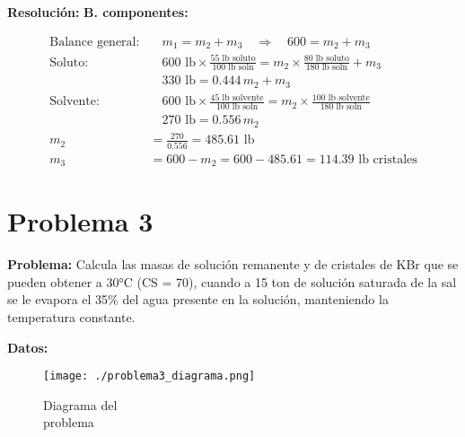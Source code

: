 \documentclass{article} %
\begin{document}

\noindent\textbf{} %

\textbf{Resolución:} %
\textbf{B. componentes:}

\begin{align*}
    \text{Balance general:} & \quad m_1 = m_2 + m_3 \quad \Rightarrow \quad 600 = m_2 + m_3 \\[10pt]
    \text{Soluto:} & \quad 600 \text{ lb} \times \frac{55 \text{ lb soluto}}{100 \text{ lb soln}} = m_2 \times \frac{80 \text{ lb soluto}}{180 \text{ lb soln}} + m_3 \\[10pt]
    & \quad 330 \text{ lb} = 0.444 \, m_2 + m_3 \\[10pt]
    \text{Solvente:} & \quad 600 \text{ lb} \times \frac{45 \text{ lb solvente}}{100 \text{ lb soln}} = m_2 \times \frac{100 \text{ lb solvente}}{180 \text{ lb soln}} \\[10pt]
    & \quad 270 \text{ lb} = 0.556 \, m_2 \\[10pt]
    m_2 &= \frac{270}{0.556} = 485.61 \text{ lb} \\[10pt]
    m_3 &= 600 - m_2 = 600 - 485.61 = 114.39 \text{ lb cristales}
\end{align*}


\newpage %
\section*{Problema 3} %
\textbf{Problema:} Calcula las masas de solución remanente y de cristales de KBr que se pueden obtener a 30°C (CS = 70), cuando a 15 ton de solución saturada de la sal se le evapora el 35\% del agua presente en la solución, manteniendo la temperatura constante.


\noindent\textbf{Datos:} %

\begin{figure}[H]
    \begin{minipage}[t]{0.3\textwidth} %
        \raggedright %
        \texttt{[image: ./problema3\_diagrama.png]} %
        \caption{Diagrama del \\ problema}
    \end{minipage}
\end{figure}
\end{document}
